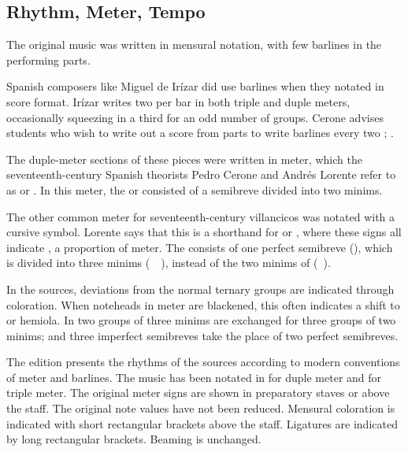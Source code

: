 \subsection{Rhythm, Meter, Tempo}
The original music was written in mensural notation, with few barlines in the 
performing parts.%
\begin{Footnote}
    Spanish composers like Miguel de Irízar did use barlines when they notated in 
    score format.
    Irízar writes two  per bar in both triple and duple meters,
    occasionally squeezing in a third  for an odd number
    of groups.
    Cerone advises students who wish to write out a score from parts to write 
    barlines every two ; \textcite[745]{Cerone:Melopeo}.
\end{Footnote}
The duple-meter sections of these pieces were written in \meterC{} meter, which
the seventeenth-century Spanish theorists Pedro Cerone and Andrés Lorente refer
to as  or .%
  \Autocites
  [537]{Cerone:Melopeo}
  [156, 210]{Lorente:Porque}
In this meter, the  or  consisted of a semibreve 
divided into two minims.%
  \Autocites
  {GonzalezValle:MusicaTexto}
  {GonzalezValle:CompasCabezon}

The other common meter for seventeenth-century villancicos was notated with
a cursive \meterCZ{} symbol.
Lorente says that this is a shorthand for \meterCThreeTwo{} or \meterCThree{},
where these signs all indicate , a proportion of \meterC{} meter.%
  \autocite[165]{Lorente:Porque}
The  consists of one perfect semibreve (\musSemibreveDotted), which
is divided into three minims (\musMinim\ \musMinim\ \musMinim), instead of the
two minims of \meterC{} (\musMinim\ \musMinim).

In the sources, deviations from the normal ternary groups are indicated through 
coloration. 
When noteheads in \meterCThree{} meter are blackened, this often indicates a
shift to  or hemiola.
In  two groups of three minims are exchanged for three 
groups of two minims; and three imperfect semibreves take the place of two
perfect semibreves.

The edition presents the rhythms of the sources according to modern conventions 
of meter and barlines.
The music has been notated in \meterC{} for duple meter and \meterCThree{}
for triple meter.
The original meter signs are shown in preparatory staves or above the staff.
The original note values have not been reduced.
Mensural coloration is indicated with short rectangular brackets above the 
staff.
Ligatures are indicated by long rectangular brackets.
Beaming is unchanged.

